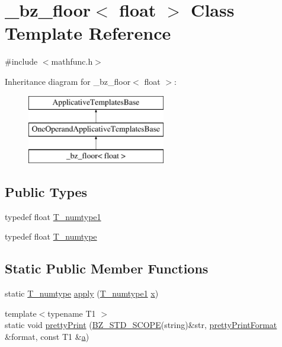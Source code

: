 \hypertarget{class__bz__floor_3_01float_01_4}{}\section{\+\_\+bz\+\_\+floor$<$ float $>$ Class Template Reference}
\label{class__bz__floor_3_01float_01_4}


{\ttfamily \#include $<$mathfunc.\+h$>$}

Inheritance diagram for \+\_\+bz\+\_\+floor$<$ float $>$\+:\begin{figure}[H]
\begin{center}
\leavevmode
\includegraphics[height=3.000000cm]{class__bz__floor_3_01float_01_4}
\end{center}
\end{figure}
\subsection*{Public Types}
\begin{DoxyCompactItemize}
\item 
typedef float \hyperlink{class__bz__floor_3_01float_01_4_a81b4b72d26c43933ba886634a44339fc}{T\+\_\+numtype1}
\item 
typedef float \hyperlink{class__bz__floor_3_01float_01_4_ad03b94283fa1dbe12e7690934e0e881f}{T\+\_\+numtype}
\end{DoxyCompactItemize}
\subsection*{Static Public Member Functions}
\begin{DoxyCompactItemize}
\item 
static \hyperlink{class__bz__floor_3_01float_01_4_ad03b94283fa1dbe12e7690934e0e881f}{T\+\_\+numtype} \hyperlink{class__bz__floor_3_01float_01_4_a9ad4776035b6750d530dc40e4baea4d5}{apply} (\hyperlink{class__bz__floor_3_01float_01_4_a81b4b72d26c43933ba886634a44339fc}{T\+\_\+numtype1} \hyperlink{vecnorm1_8cc_ac73eed9e41ec09d58f112f06c2d6cb63}{x})
\item 
{\footnotesize template$<$typename T1 $>$ }\\static void \hyperlink{class__bz__floor_3_01float_01_4_a312fa1ea4320faaba85c669e9ac0d6fe}{pretty\+Print} (\hyperlink{numinquire_8h_a2b24ffc3b4ef9803956bc7715c6c7b83}{B\+Z\+\_\+\+S\+T\+D\+\_\+\+S\+C\+O\+P\+E}(string)\&str, \hyperlink{classprettyPrintFormat}{pretty\+Print\+Format} \&format, const T1 \&\hyperlink{gen__mat5files_8m_aae328bf20413f220e38aec4d95bfd6da}{a})
\end{DoxyCompactItemize}


